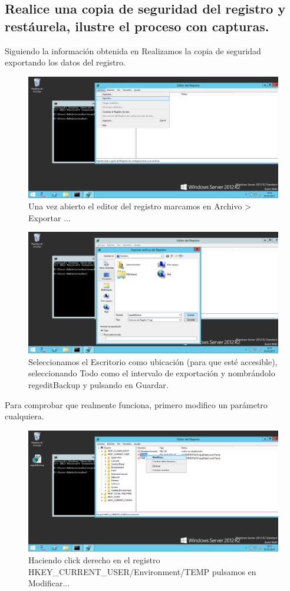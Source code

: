 \subsection{Realice una copia de seguridad del registro y restáurela, ilustre el proceso con capturas.}
Siguiendo la información obtenida en \cite{c3}
Realizamos la copia de seguridad exportando los datos del registro.
\begin{figure}[H]
	\centering
	\includegraphics[scale=0.4]{regedit1.png}
	\caption{Una vez abierto el editor del registro marcamos en Archivo > Exportar ...}
\end{figure}

\begin{figure}[H]
	\centering
	\includegraphics[scale=0.4]{regedit2.png}
	\caption{Seleccionamos el Escritorio como ubicación (para que esté accesible), seleccionando Todo como el intervalo de exportación y nombrándolo regeditBackup y pulsando en Guardar.}
\end{figure}

Para comprobar que realmente funciona, primero modifico un parámetro cualquiera.
\begin{figure}[H]
	\centering
	\includegraphics[scale=0.4]{regedit3.png}
	\caption{Haciendo click derecho en el registro HKEY\_CURRENT\_USER/Environment/TEMP pulsamos en Modificar...}
\end{figure}

